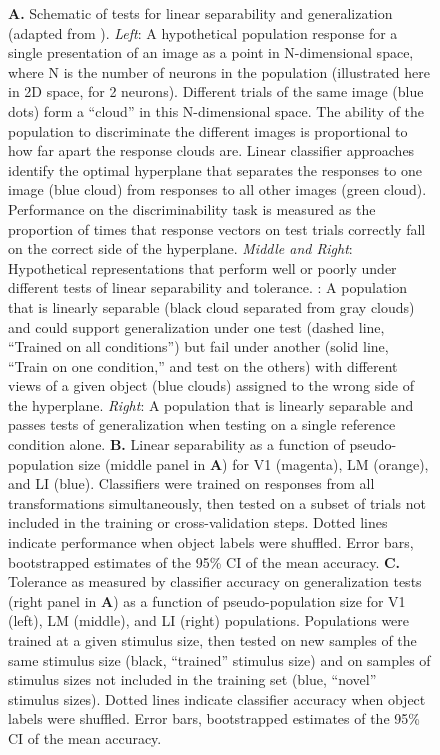 \begin{figure}[t!]
{    \textbf{A.} Schematic of tests for linear separability and generalization (adapted from \cite{Rust2010SelectivityIT}). \textit{Left}: A hypothetical population response for a single presentation of an image as a point in N-dimensional space, where N is the number of neurons in the population (illustrated here in 2D space, for 2 neurons). Different trials of the same image (blue dots) form a “cloud” in this N-dimensional space. The ability of the population to discriminate the different images is proportional to how far apart the response clouds are. Linear classifier approaches identify the optimal hyperplane that separates the responses to one image (blue cloud) from responses to all other images (green cloud). Performance on the discriminability task is measured as the proportion of times that response vectors on test trials correctly fall on the correct side of the hyperplane. \textit{Middle and Right}: Hypothetical representations that perform well or poorly under different tests of linear separability and tolerance. : A population that is linearly separable (black cloud separated from gray clouds) and could support generalization under one test (dashed line, “Trained on all conditions”) but fail under another (solid line, “Train on one condition,” and test on the others) with different views of a given object (blue clouds) assigned to the wrong side of the hyperplane. \textit{Right}: A population that is linearly separable and passes tests of generalization when testing on a single reference condition alone.
    \textbf{B.} Linear separability as a function of pseudo-population size (middle panel in \textbf{A}) for V1 (magenta), LM (orange), and LI (blue). Classifiers were trained on responses from all transformations simultaneously, then tested on a subset of trials not included in the training or cross-validation steps. Dotted lines indicate performance when object labels were shuffled. Error bars, bootstrapped estimates of the 95\% CI of the mean accuracy. 
    \textbf{C.} Tolerance as measured by classifier accuracy on generalization tests (right panel in \textbf{A}) as a function of pseudo-population size for V1 (left), LM (middle), and LI (right) populations. Populations were trained at a given stimulus size, then tested on new samples of the same stimulus size (black, “trained” stimulus size) and on samples of stimulus sizes not included in the training set (blue, “novel” stimulus sizes). Dotted lines indicate classifier accuracy when object labels were shuffled. Error bars, bootstrapped estimates of the 95\% CI of the mean accuracy.
}
\end{figure}
